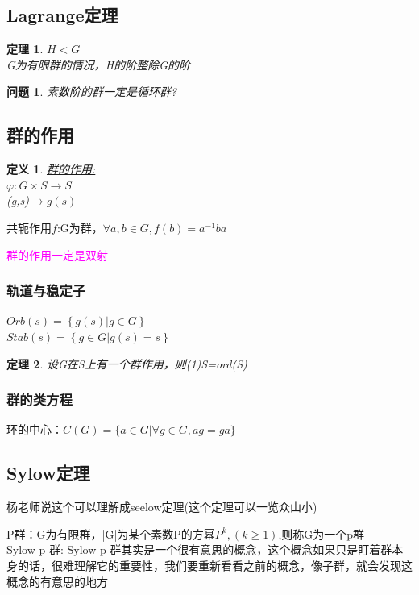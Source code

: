 \documentclass{report}
\newtheorem{theorem}{定理}[section]
\newtheorem{definition}{定义}
\newtheorem{problem}[exercise]{问题}
\begin{document}
\subsection{Lagrange定理}
\begin{theorem}
\noindent $H<G$
\\G为有限群的情况，H的阶整除G的阶 \\
\end{theorem}
\begin{problem}
素数阶的群一定是循环群?
\end{problem}

\subsection{群的作用}
\begin{definition} \href{https://ncatlab.org/nlab/show/action}{群的作用:}\\ $\varphi:G \times S \rightarrow S$
\\(g,s)$\rightarrow g(s)$
\end{definition}

\begin{framed}
	\noindent 共轭作用$ f $:G为群，$\forall a,b\in G,f(b)=a^{-1}ba$
\end{framed}
\noindent\textcolor{magenta}{群的作用一定是双射}
\subsubsection{轨道与稳定子}
\noindent $Orb(s)=\left\{g(s)|g \in G\right\}$
\\
$Stab(s)=\left\{g\in G|g(s)=s\right\}$
\begin{theorem}
设G在S上有一个群作用，则(1)S=ord(S)
\end{theorem}
\subsubsection{群的类方程}
\begin{framed}
	\noindent 环的中心：$C(G)= \{ a \in G|\forall g \in G,ag=ga \}$
\end{framed}
\subsection{Sylow定理}
\begin{framed}
\noindent 杨老师说这个可以理解成seelow定理(这个定理可以一览众山小)
\end{framed}
\noindent P群：G为有限群，|G|为某个素数P的方幂$P^{k},(k \geq 1)$,则称G为一个p群 \\
\noindent \href{https://ncatlab.org/nlab/show/Sylow%20p-subgroup}{Sylow p-群:} 
Sylow p-群其实是一个很有意思的概念，这个概念如果只是盯着群本身的话，很难理解它的重要性，我们要重新看看之前的概念，像子群，就会发现这概念的有意思的地方
\end{document}
